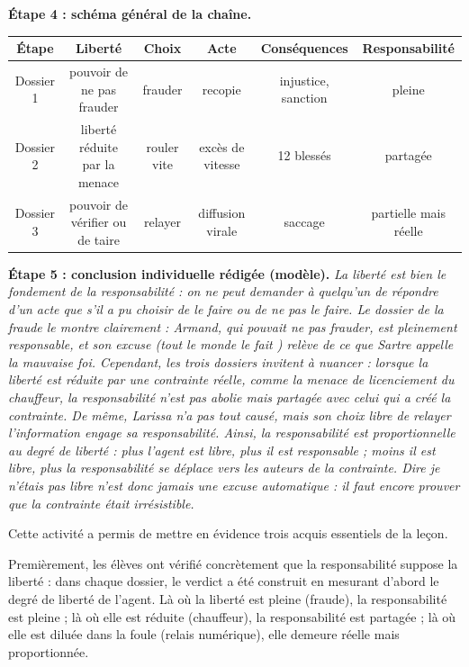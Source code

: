 \documentclass[11pt]{article}
\newcommand{\cle}[1]{{\popxbold\color{popdark}#1}}
\newcounter{popsec}
\newcounter{popsub}
\newcommand{\courssub}[1]{%
  \stepcounter{popsub}%
  \par\vspace{9pt}\noindent{\popxbold\fontsize{11.5}{13}\selectfont\color{popink}{\color{poporange}\thepopsec.\thepopsub}\hspace{6pt}#1}\par\nopagebreak\vspace{4pt}
}
\begin{document}
\begin{exoresolu}
\textbf{Étape 4 : schéma général de la chaîne.}
\begin{center}
\begin{tabular}{|c|ccccc|}
\hline
\rowcolor{popblueL} Étape & Liberté & Choix & Acte & Conséquences & Responsabilité \\
\hline
Dossier 1 & pouvoir de ne pas frauder & frauder & recopie & injustice, sanction & pleine \\
\hline
Dossier 2 & liberté réduite par la menace & rouler vite & excès de vitesse & 12 blessés & partagée \\
\hline
Dossier 3 & pouvoir de vérifier ou de taire & relayer & diffusion virale & saccage & partielle mais réelle \\
\hline
\end{tabular}
\end{center}

\textbf{Étape 5 : conclusion individuelle rédigée (modèle).} \emph{La liberté est bien le fondement de la responsabilité : on ne peut demander à quelqu'un de répondre d'un acte que s'il a pu choisir de le faire ou de ne pas le faire. Le dossier de la fraude le montre clairement : Armand, qui pouvait ne pas frauder, est pleinement responsable, et son excuse (\og tout le monde le fait \fg{}) relève de ce que Sartre appelle la mauvaise foi. Cependant, les trois dossiers invitent à nuancer : lorsque la liberté est réduite par une contrainte réelle, comme la menace de licenciement du chauffeur, la responsabilité n'est pas abolie mais partagée avec celui qui a créé la contrainte. De même, Larissa n'a pas tout causé, mais son choix libre de relayer l'information engage sa responsabilité. Ainsi, la responsabilité est proportionnelle au degré de liberté : plus l'agent est libre, plus il est responsable ; moins il est libre, plus la responsabilité se déplace vers les auteurs de la contrainte. Dire \og je n'étais pas libre \fg{} n'est donc jamais une excuse automatique : il faut encore prouver que la contrainte était irrésistible.}
\end{exoresolu}

\courssub{Bilan de l'activité}

Cette activité a permis de mettre en évidence trois acquis essentiels de la leçon.

Premièrement, les élèves ont vérifié concrètement que la \cle{responsabilité} suppose la \cle{liberté} : dans chaque dossier, le verdict a été construit en mesurant d'abord le degré de liberté de l'agent. Là où la liberté est pleine (fraude), la responsabilité est pleine ; là où elle est réduite (chauffeur), la responsabilité est partagée ; là où elle est diluée dans la foule (relais numérique), elle demeure réelle mais proportionnée.
\end{document}
